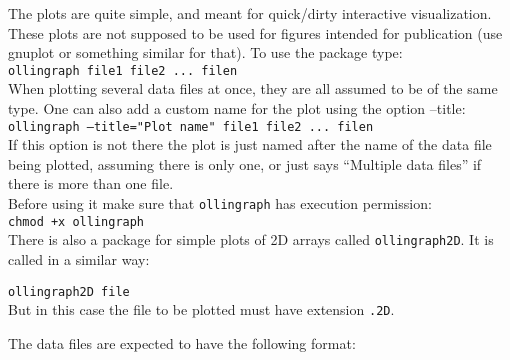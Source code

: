 \documentclass[12pt]{article}
\begin{document}
The plots are quite simple, and meant for quick/dirty interactive
visualization.  These plots are not supposed to be used for figures
intended for publication (use gnuplot or something similar for
that). To use the package type: \\

\texttt{ollingraph  file1 file2 ... filen} \\

When plotting several data files at once, they are all assumed to be
of the same type.  One can also add a custom name for the plot using
the option --title: \\

\texttt{ollingraph --title="Plot name" file1 file2 ... filen} \\

If this option is not there the plot is just named after the name of
the data file being plotted, assuming there is only one, or just says
``Multiple data files'' if there is more than one file. \\

Before using it make sure that \texttt{ollingraph} has execution
permission: \\

\texttt{chmod +x ollingraph} \\

There is also a package for simple plots of 2D arrays called
\texttt{ollingraph2D}. It is called in a similar way:

\texttt{ollingraph2D  file} \\

But in this case the file to be plotted must have extension
\texttt{.2D}.

\vspace{5mm}

The data files are expected to have the following format:
\end{document}
